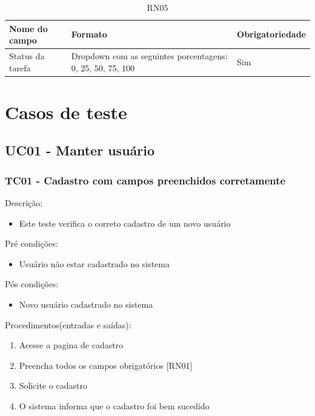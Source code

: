 \begin{apendicesenv}
\begin{table}[!h]
\centering
\caption{RN05}
\label{RN05}
\begin{tabular}{|p{4cm}|p{8cm}|p{3cm}|}
\hline
Nome do campo          & Formato                                                    & Obrigatoriedade \\ \hline
Status da tarefa       & Dropdown com as seguintes porcentagens: 0, 25, 50, 75, 100 & Sim             \\ \hline
\end{tabular}
\end{table}























\chapter{Casos de teste}

\section{UC01 - Manter usuário}

\subsection{TC01 - Cadastro com campos preenchidos corretamente}


Descrição:
\begin{itemize}
  \item{Este teste verifica o correto cadastro de um novo usuário}
\end{itemize}


Pré condições:
\begin{itemize}
  \item{Usuário não estar cadastrado no sistema}
\end{itemize}


Pós condições:
\begin{itemize}
  \item{Novo usuário cadastrado no sistema}
\end{itemize}

Procedimentos(entradas e saídas):
\begin{enumerate}
  \item{Acesse a pagina de cadastro}
  \item{Preencha todos os campos obrigatórios [RN01]}
  \item{Solicite o cadastro}
  \item{O sistema informa que o cadastro foi bem sucedido}
\end{enumerate}




\end{apendicesenv}
